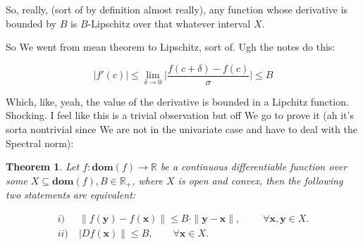 \documentclass{article}
\newtheorem{theorem}{Theorem}[section]
\begin{document}
		So, really, (sort of by definition almost really), any function whose derivative is bounded by $B$ is $B$-Lipschitz over that whatever interval $X$. 
		
		So We went from mean theorem to Lipschitz, sort of. Ugh the notes do this:
		
		\[ |f'(c)| \le \lim_{\delta\to 0} \bigg| \frac{f(c+\delta) - f(c)}{\sigma} \bigg| \le B \]
		
		Which, like, yeah, the value of the derivative is bounded in a Lipchitz function. Shocking. I feel like this is a trivial observation but off We go to prove it (ah it's sorta nontrivial since We are not in the univariate case and have to deal with the Spectral norm):
		
		\begin{theorem}
			Let $f:\mathbf{dom}(f)\to\mathbb{R}$ be a continuous differentiable function over some  $X\subseteq\mathbf{dom}(f), B\in\mathbb{R}_+$, where $X$ is open and convex, then the following two statements are equivalent:
			
			\begin{align*}
				i)\;& \| f(\mathbf{y}) - f(\mathbf{x}) \| \le B\cdot \|\mathbf{y-x}\|, \qquad \; \forall\mathbf{x, y}\in X. \\
				ii)\;& |Df(\mathbf{x})\| \le B,\qquad  \forall\mathbf{x}\in X.
			\end{align*}
			
		\end{theorem}
		
\end{document}
